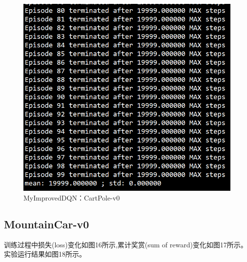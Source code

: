 \documentclass[a4paper,UTF8]{article}
\theoremstyle{definition}
\begin{document}
    \begin{center}
    \begin{figure}[H]
          \centering
          \includegraphics[width=12cm]{28.png}
          \caption{MyImprovedDQN：CartPole-v0}
          \label{fig:2.3}
    \end{figure}
    \end{center}
    \subsection{MountainCar-v0}
    训练过程中损失(loss)变化如图16所示,累计奖赏(sum of reward)变化如图17所示。实验运行结果如图18所示。
\end{document}

